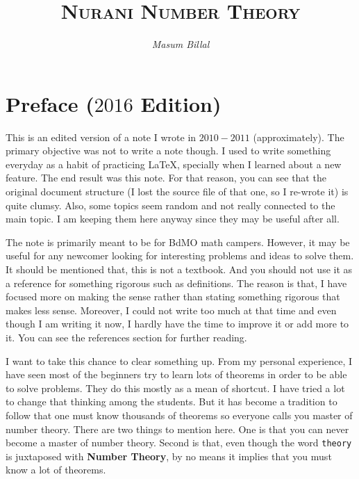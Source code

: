 \documentclass[a4paper, leqno]{article}
\author{\itshape Masum Billal}
\title{\scshape Nurani Number Theory}
\theoremstyle{definition}
\theoremstyle{remark}
\begin{document}
	\maketitle
	\titlepage
	\section*{Preface ($2016$ Edition)}
		This is an edited version of a note I wrote in $2010-2011$ (approximately). The primary objective was not to write a note though. I used to write something everyday as a habit of practicing \LaTeX, specially when I learned about a new feature. The end result was this note. For that reason, you can see that the original document structure (I lost the source file of that one, so I re-wrote it) is quite clumsy. Also, some topics seem random and not really connected to the main topic. I am keeping them here anyway since they may be useful after all.
		
		The note is primarily meant to be for BdMO math campers. However, it may be useful for any newcomer looking for interesting problems and ideas to solve them. It should be mentioned that, this is not a textbook. And you should not use it as a reference for something rigorous such as definitions. The reason is that, I have focused more on making the sense rather than stating something rigorous that makes less sense. Moreover, I could not write too much at that time and even though I am writing it now, I hardly have the time to improve it or add more to it. You can see the references section for further reading.
		
		I want to take this chance to clear something up. From my personal experience, I have seen most of the beginners try to learn lots of theorems in order to be able to solve problems. They do this mostly as a mean of shortcut. I have tried a lot to change that thinking among the students. But it has become a tradition to follow that one must know thousands of theorems so everyone calls you master of number theory. There are two things to mention here. One is that you can never become a master of number theory. Second is that, even though the word \texttt{theory} is juxtaposed with \textbf{Number Theory}, by no means it implies that you must know a lot of theorems.
		
\end{document}

